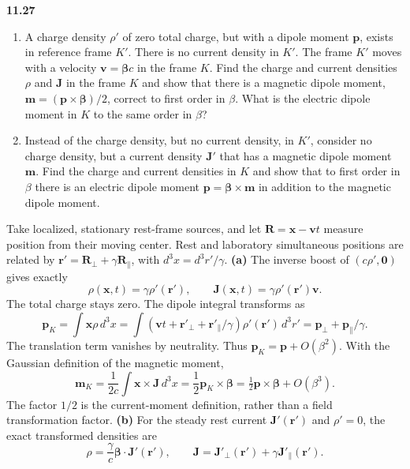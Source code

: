 \par\bigskip
\noindent\textbf{11.27}\quad\begin{enumerate}
\item[(a)] A charge density $\rho'$ of zero total charge, but with a dipole moment $\mathbf{p}$, exists in reference frame $K'$. There is no current density in $K'$. The frame $K'$ moves with a velocity $\mathbf{v}=\boldsymbol{\beta}c$ in the frame $K$. Find the charge and current densities $\rho$ and $\mathbf{J}$ in the frame $K$ and show that there is a magnetic dipole moment, $\mathbf{m}=(\mathbf{p}\times\boldsymbol{\beta})/2$, correct to first order in $\beta$. What is the electric dipole moment in $K$ to the same order in $\beta$?
\item[(b)] Instead of the charge density, but no current density, in $K'$, consider no charge density, but a  current density $\mathbf{J}'$ that has a magnetic dipole moment $\mathbf{m}$. Find the charge and current densities in $K$ and show that to first order in $\beta$ there is an electric dipole moment $\mathbf{p}=\boldsymbol{\beta}\times\mathbf{m}$ in addition to the magnetic dipole moment.
\end{enumerate}
\solution
Take localized, stationary rest-frame sources, and let
$\mathbf R=\mathbf x-\mathbf vt$ measure position from their moving
center. Rest and laboratory simultaneous positions are related by
$\mathbf r'=\mathbf R_\perp+\gamma\mathbf R_\parallel$, with
$d^3x=d^3r'/\gamma$.
\textbf{(a)} The inverse boost of $(c\rho',\mathbf0)$ gives exactly
\[
\boxed{\rho(\mathbf x,t)=\gamma\rho'(\mathbf r'),\qquad
\mathbf J(\mathbf x,t)=\gamma\rho'(\mathbf r')\mathbf v.}
\]
The total charge stays zero. The dipole integral transforms as
\[
\mathbf p_K=\int\mathbf x\rho\,d^3x
=\int(\mathbf vt+\mathbf r'_\perp+\mathbf r'_\parallel/\gamma)
\rho'(\mathbf r')\,d^3r'
=\mathbf p_\perp+\mathbf p_\parallel/\gamma.
\]
The translation term vanishes by neutrality. Thus
$\mathbf p_K=\mathbf p+O(\beta^2)$. With the Gaussian definition
of the magnetic moment,
\[
\mathbf m_K=\frac1{2c}\int\mathbf x\times\mathbf J\,d^3x
=\frac12\mathbf p_K\times\boldsymbol\beta
=\boxed{\tfrac12\mathbf p\times\boldsymbol\beta+O(\beta^3).}
\]
The factor $1/2$ is the current-moment definition, rather than a
field transformation factor.
\textbf{(b)} For the steady rest current $\mathbf J'(\mathbf r')$
and $\rho'=0$, the exact transformed densities are
\[
\boxed{\rho=\frac\gamma c\boldsymbol\beta\cdot\mathbf J'(\mathbf r'),
\qquad \mathbf J=\mathbf J'_\perp(\mathbf r')+
\gamma\mathbf J'_\parallel(\mathbf r').}
\]
